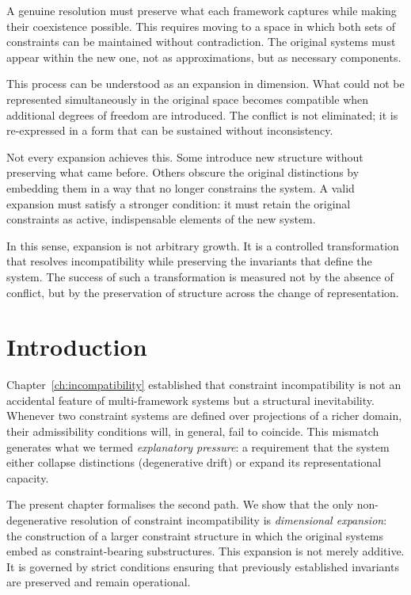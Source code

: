 \documentclass[11pt,openany]{book}
\begin{document}
A genuine resolution must preserve what each framework captures while making their coexistence possible. This requires moving to a space in which both sets of constraints can be maintained without contradiction. The original systems must appear within the new one, not as approximations, but as necessary components.

This process can be understood as an expansion in dimension. What could not be represented simultaneously in the original space becomes compatible when additional degrees of freedom are introduced. The conflict is not eliminated; it is re-expressed in a form that can be sustained without inconsistency.

Not every expansion achieves this. Some introduce new structure without preserving what came before. Others obscure the original distinctions by embedding them in a way that no longer constrains the system. A valid expansion must satisfy a stronger condition: it must retain the original constraints as active, indispensable elements of the new system.

In this sense, expansion is not arbitrary growth. It is a controlled transformation that resolves incompatibility while preserving the invariants that define the system. The success of such a transformation is measured not by the absence of conflict, but by the preservation of structure across the change of representation.

\section{Introduction}
\label{sec:introduction-expansion}

Chapter~\ref{ch:incompatibility} established that constraint
incompatibility is not an accidental feature of
multi-framework systems but a structural inevitability.
Whenever two constraint systems are defined over projections
of a richer domain, their admissibility conditions will, in
general, fail to coincide. This mismatch generates what we
termed \emph{explanatory pressure}: a requirement that the
system either collapse distinctions (degenerative drift) or
expand its representational capacity.

The present chapter formalises the second path. We show that
the only non-degenerative resolution of constraint
incompatibility is \emph{dimensional expansion}: the
construction of a larger constraint structure in which the
original systems embed as constraint-bearing substructures.
This expansion is not merely additive. It is governed by
strict conditions ensuring that previously established
invariants are preserved and remain operational.
\end{document}
